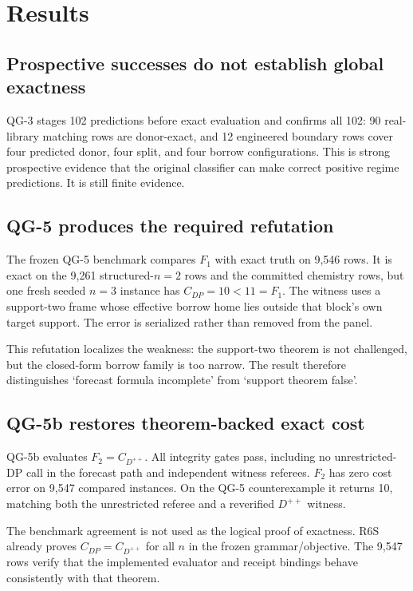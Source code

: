 \section{Results}

\subsection{Prospective successes do not establish global exactness}
QG-3 stages 102 predictions before exact evaluation and confirms all 102: 90 real-library matching rows are donor-exact, and 12 engineered boundary rows cover four predicted donor, four split, and four borrow configurations. This is strong prospective evidence that the original classifier can make correct positive regime predictions. It is still finite evidence.

\subsection{QG-5 produces the required refutation}
The frozen QG-5 benchmark compares $F_1$ with exact truth on 9,546 rows. It is exact on the 9,261 structured-$n=2$ rows and the committed chemistry rows, but one fresh seeded $n=3$ instance has $C_{DP}=10<11=F_1$. The witness uses a support-two frame whose effective borrow home lies outside that block's own target support. The error is serialized rather than removed from the panel.

This refutation localizes the weakness: the support-two theorem is not challenged, but the closed-form borrow family is too narrow. The result therefore distinguishes `forecast formula incomplete' from `support theorem false'.

\subsection{QG-5b restores theorem-backed exact cost}
QG-5b evaluates $F_2=C_{D^{++}}$. All integrity gates pass, including no unrestricted-DP call in the forecast path and independent witness referees. $F_2$ has zero cost error on 9,547 compared instances. On the QG-5 counterexample it returns 10, matching both the unrestricted referee and a reverified $D^{++}$ witness.

The benchmark agreement is not used as the logical proof of exactness. R6S already proves $C_{DP}=C_{D^{++}}$ for all $n$ in the frozen grammar/objective. The 9,547 rows verify that the implemented evaluator and receipt bindings behave consistently with that theorem.

